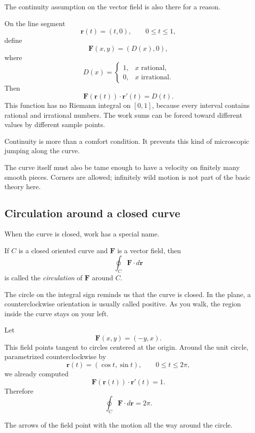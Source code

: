 The continuity assumption on the vector field is also there for a reason.

\begin{example}
On the line segment
\[
    \mathbf r(t)=(t,0),
    \qquad
    0\le t\le1,
\]
define
\[
    \mathbf F(x,y)=(D(x),0),
\]
where
\[
    D(x)=
    \begin{cases}
    1, & x \text{ rational},\\
    0, & x \text{ irrational}.
    \end{cases}
\]
Then
\[
    \mathbf F(\mathbf r(t))\cdot\mathbf r'(t)=D(t).
\]
This function has no Riemann integral on \([0,1]\), because every interval contains
rational and irrational numbers.  The work sums can be forced toward different values
by different sample points.

Continuity is more than a comfort condition.  It prevents this kind of microscopic
jumping along the curve.
\end{example}

The curve itself must also be tame enough to have a velocity on finitely many smooth
pieces.  Corners are allowed; infinitely wild motion is not part of the basic theory here.

\subsection{Circulation around a closed curve}

When the curve is closed, work has a special name.

\begin{definition}[Circulation]
If \(C\) is a closed oriented curve and \(\mathbf F\) is a vector field, then
\[
\boxed{
    \oint_C \mathbf F\cdot d\mathbf r
}
\]
is called the \emph{circulation} of \(\mathbf F\) around \(C\).
\end{definition}

The circle on the integral sign reminds us that the curve is closed.  In the plane, a
counterclockwise orientation is usually called positive.  As you walk, the region inside
the curve stays on your left.

\begin{example}
Let
\[
    \mathbf F(x,y)=(-y,x).
\]
This field points tangent to circles centered at the origin.  Around the unit circle,
parametrized counterclockwise by
\[
    \mathbf r(t)=(\cos t,\sin t),
    \qquad
    0\le t\le2\pi,
\]
we already computed
\[
    \mathbf F(\mathbf r(t))\cdot\mathbf r'(t)=1.
\]
Therefore
\[
\boxed{
    \oint_C \mathbf F\cdot d\mathbf r=2\pi.
}
\]

The arrows of the field point with the motion all the way around the circle.
\end{example}

